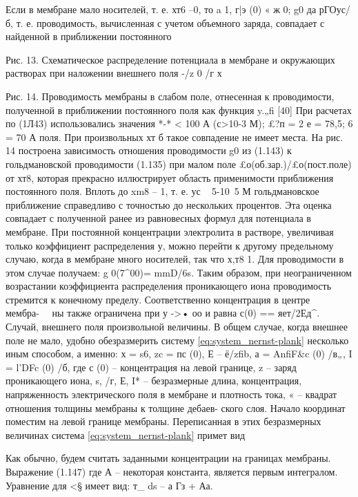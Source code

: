 {Если в мембране мало носителей, т. е. хт6 --0, то a 1, г|э (0) « ж 0; g0 да рГОус/б, т. е. проводимость, вычисленная с учетом объемного заряда, совпадает с найденной в приближении постоянного

Рис. 13. Схематическое распределение потенциала в мембране и окружающих растворах при наложении внешнего поля
-/z 0 /г х

Рис. 14. Проводимость мембраны в слабом поле, отнесенная к проводимости, полученной в приближении постоянного поля как функция y.„fi [40]
При расчетах по (1Л43) использовались значения *-* < 100 А (с>10-3 М); £?п = 2 е = 78,5; 6 = 70 А
поля. При произвольных хт б такое совпадение не имеет места. На рис. 14 построена зависимость отношения проводимости g0 из (1.143) к гольдмановской проводимости (1.135) при малом поле £о(об.зар.)/£о(пост.поле) от хт8, которая прекрасно иллюстрирует область применимости приближения постоянного поля. Вплоть до xm8 -- 1, т. е. ус ~ 5-10~5 М гольдмановское приближение справедливо с точностью до нескольких процентов. Эта оценка совпадает с полученной ранее из равновесных формул для потенциала в мембране.
При постоянной концентрации электролита в растворе, увеличивая только коэффициент распределения у, можно перейти к другому предельному случаю, когда в мембране много носителей, так что х,т8 1. Для проводимости в этом случае получаем:
g 0(7^00)= mmD/6s.
Таким образом, при неограниченном возрастании коэффициента распределения проникающего иона проводимость стремится к конечному пределу. Соответственно концентрация в центре мембра- 
ны также ограничена при у ->• оо и равна с(0) == яет/2Ед^.
Случай, внешнего поля произвольной величины. В общем случае, когда внешнее поле не мало, удобно обезразмерить систему \eqref{eq:system_nernst-plank} несколько иным способом, а именно:
х = s6, zc = пс (0), Е -- ё/zfib,
а = AnfiF&c (0) /в„, I = l'DFc (0) /б,
где с (0) -- концентрация на левой границе, z -- заряд проникающего иона, s, /г, Е, I* -- безразмерные длина, концентрация, напряженность электрического поля в мембране и плотность тока, « -- квадрат отношения толщины мембраны к толщине дебаев- ского слоя. Начало координат поместим на левой границе мембраны. Переписанная в этих безразмерных величинах система \eqref{eq:system_nernst-plank} примет вид


Как обычно, будем считать заданными концентрации на границах мембраны. Выражение
(1.147)
где А -- некоторая константа, является первым интегралом. Уравнение для <§ имеет вид:
т_
ds
-- а Гз + Аа.



}
